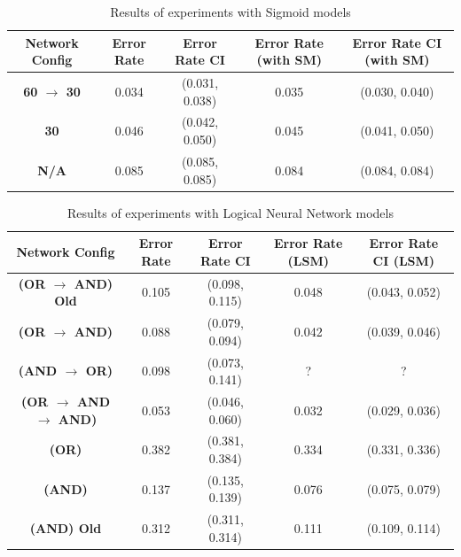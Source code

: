 \begin{table}[H]
	\begin{center}
		\begin{tabular}{| c | c | c | c | c |}
			\hline
			\textbf{Network Config} & \textbf{Error Rate} & \textbf{Error Rate CI} & \textbf{Error Rate (with SM)} & \textbf{Error Rate CI (with SM)}\\
			\hline
			\hline
			\textbf{60 $\rightarrow$ 30} & 0.034 & (0.031, 0.038) & 0.035 & (0.030, 0.040)\\
			\textbf{30} & 0.046 & (0.042, 0.050) & 0.045 & (0.041, 0.050)\\
			\textbf{N/A} & 0.085 & (0.085, 0.085) & 0.084 & (0.084, 0.084)\\
			\hline
		\end{tabular}
	\end{center}
	\caption{Results of experiments with Sigmoid models}
	\label{tab:mnist-sigmoid-peformance-results}
\end{table}

\begin{table}[H]
	\begin{center}
		\begin{tabular}{| c | c | c | c | c |}
			\hline
			\textbf{Network Config} & \textbf{Error Rate} & \textbf{Error Rate CI} & \textbf{Error Rate (LSM)} & \textbf{Error Rate CI (LSM)}\\
			\hline
			\hline
			\textbf{(OR $\rightarrow$ AND) Old } & 0.105 & (0.098, 0.115) & 0.048 & (0.043, 0.052)\\
			\textbf{(OR $\rightarrow$ AND) } & 0.088 & (0.079, 0.094) & 0.042 & (0.039, 0.046)\\
			\textbf{(AND $\rightarrow$ OR) } & 0.098 & (0.073, 0.141) & ? & ?\\
			\textbf{(OR $\rightarrow$ AND $\rightarrow$ AND) } & 0.053 & (0.046, 0.060) & 0.032 & (0.029, 0.036)\\
			\textbf{(OR) } & 0.382 & (0.381, 0.384) & 0.334 & (0.331, 0.336)\\
			\textbf{(AND) } & 0.137 & (0.135, 0.139) & 0.076 & (0.075, 0.079)\\
			\textbf{(AND) Old} & 0.312 & (0.311, 0.314) & 0.111 & (0.109, 0.114)\\
			\hline
		\end{tabular}
	\end{center}
	\caption{Results of experiments with Logical Neural Network models}
	\label{tab:mnist-lnn-peformance-results}
\end{table}

